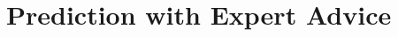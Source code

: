 \documentclass[../main]{subfiles}
\begin{document}
\setcounter{chapter}{1}

\chapter{Prediction with Expert Advice}




















\end{document}
